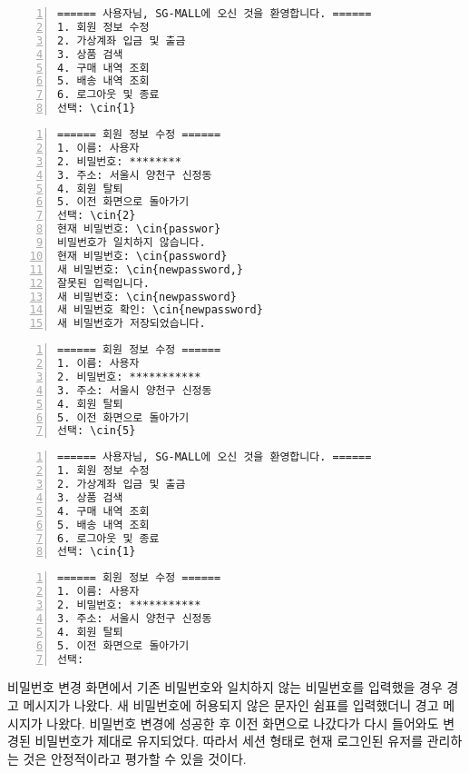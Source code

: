 \documentclass[runningheads]{llncs}
\newcommand{\cin}[1]{\textbf{\textcolor{orange}{#1}}}
\begin{document}
\begin{Verbatim}[frame=single,numbers=left,commandchars=\\\{\}]
====== 사용자님, SG-MALL에 오신 것을 환영합니다. ======
1. 회원 정보 수정
2. 가상계좌 입금 및 출금
3. 상품 검색
4. 구매 내역 조회
5. 배송 내역 조회
6. 로그아웃 및 종료
선택: \cin{1}
\end{Verbatim}

\begin{Verbatim}[frame=single,numbers=left,commandchars=\\\{\}]
====== 회원 정보 수정 ======
1. 이름: 사용자
2. 비밀번호: ********
3. 주소: 서울시 양천구 신정동
4. 회원 탈퇴
5. 이전 화면으로 돌아가기
선택: \cin{2}
현재 비밀번호: \cin{passwor}
비밀번호가 일치하지 않습니다.
현재 비밀번호: \cin{password}
새 비밀번호: \cin{newpassword,}
잘못된 입력입니다.
새 비밀번호: \cin{newpassword}
새 비밀번호 확인: \cin{newpassword}
새 비밀번호가 저장되었습니다.
\end{Verbatim}

\begin{Verbatim}[frame=single,numbers=left,commandchars=\\\{\}]
====== 회원 정보 수정 ======
1. 이름: 사용자
2. 비밀번호: ***********
3. 주소: 서울시 양천구 신정동
4. 회원 탈퇴
5. 이전 화면으로 돌아가기
선택: \cin{5}
\end{Verbatim}

\begin{Verbatim}[frame=single,numbers=left,commandchars=\\\{\}]
====== 사용자님, SG-MALL에 오신 것을 환영합니다. ======
1. 회원 정보 수정
2. 가상계좌 입금 및 출금
3. 상품 검색
4. 구매 내역 조회
5. 배송 내역 조회
6. 로그아웃 및 종료
선택: \cin{1}
\end{Verbatim}

\begin{Verbatim}[frame=single,numbers=left,commandchars=\\\{\}]
====== 회원 정보 수정 ======
1. 이름: 사용자
2. 비밀번호: ***********
3. 주소: 서울시 양천구 신정동
4. 회원 탈퇴
5. 이전 화면으로 돌아가기
선택: 
\end{Verbatim}

비밀번호 변경 화면에서 기존 비밀번호와 일치하지 않는 비밀번호를 입력했을 경우 경고 메시지가 나왔다. 새 비밀번호에 허용되지 않은 문자인 쉼표를 입력했더니 경고 메시지가 나왔다. 비밀번호 변경에 성공한 후 이전 화면으로 나갔다가 다시 들어와도 변경된 비밀번호가 제대로 유지되었다. 따라서 세션 형태로 현재 로그인된 유저를 관리하는 것은 안정적이라고 평가할 수 있을 것이다.
\end{document}
